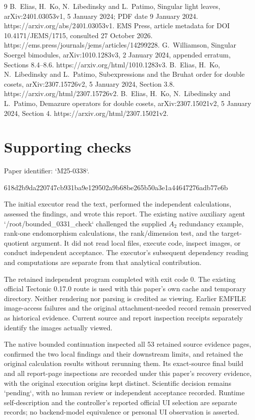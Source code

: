 \documentclass[10pt]{article}
\begin{document}
9 B. Elias, H. Ko, N. Libedinsky and L. Patimo, Singular light leaves, arXiv:2401.03053v1, 5 January 2024; PDF date 9 January 2024. https://arxiv.org/abs/2401.03053v1. EMS Press, article metadata for DOI 10.4171/JEMS/1715, consulted 27 October 2026. https://ems.press/journals/jems/articles/14299228. G. Williamson, Singular Soergel bimodules, arXiv:1010.1283v3, 2 January 2024, appended erratum, Sections 8.4–8.6. https://arxiv.org/html/1010.1283v3. B. Elias, H. Ko, N. Libedinsky and L. Patimo, Subexpressions and the Bruhat order for double cosets, arXiv:2307.15726v2, 5 January 2024, Section 3.8. https://arxiv.org/html/2307.15726v2. B. Elias, H. Ko, N. Libedinsky and L. Patimo, Demazure operators for double cosets, arXiv:2307.15021v2, 5 January 2024, Section 4. https://arxiv.org/html/2307.15021v2.\par
\section*{Supporting checks}
Paper identifier: `M25-0338`.\par
618d2b9da220747cb931ba9e129502a9b68be265b50a3e1a44647276adb77e6b\par
The initial executor read the text, performed the independent calculations, assessed the findings, and wrote this report. The existing native auxiliary agent `/root/bounded\_0331\_check` challenged the supplied \(A_2\) redundancy example, rank-one endomorphism calculations, the rank/dimension test, and the target-quotient argument. It did not read local files, execute code, inspect images, or conduct independent acceptance. The executor’s subsequent dependency reading and computations are separate from that analytical contribution.\par
The retained independent program completed with exit code \(0\). The existing official Tectonic 0.17.0 route is used with this paper’s own cache and temporary directory. Neither rendering nor parsing is credited as viewing. Earlier EMFILE image-access failures and the original attachment-needed record remain preserved as historical evidence. Current source and report inspection receipts separately identify the images actually viewed.\par
The native bounded continuation inspected all 53 retained source evidence pages, confirmed the two local findings and their downstream limits, and retained the original calculation results without rerunning them. Its exact-source final build and all report-page inspections are recorded under this paper’s recovery evidence, with the original execution origins kept distinct. Scientific decision remains `pending`, with no human review or independent acceptance recorded. Runtime self-description and the controller’s reported official UI selection are separate records; no backend-model equivalence or personal UI observation is asserted.\par
\end{document}
